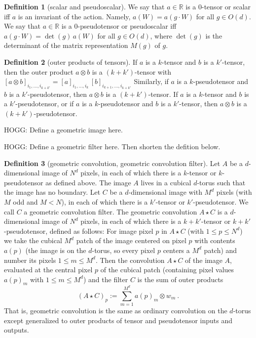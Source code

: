 \documentclass{article}
\theoremstyle{definition}
\newtheorem{definition}{Definition}
\begin{document}
\begin{definition}[scalar and pseudoscalar]
We say that $a\in \mathbb R$ is a $0$-tensor or scalar iff $a$ is an invariant of the action.
Namely, $a(W) = a(g\cdot W)$ for all $g\in O(d)$.
We say that
$a\in \mathbb R$ is a $0$-pseudotensor or pseudoscalar iff $a(g \cdot W) = \det(g)\,a(W)$ for all $g\in O(d)$,
where $\det(g)$ is the determinant of the matrix representation $M(g)$ of $g$.
\end{definition}

\begin{definition}[outer products of tensors]
If $a$ is a $k$-tensor and $b$ is a $k'$-tensor, then the outer product $a\otimes b$ is a $(k+k')$-tensor with $[a\otimes b]_{i_1,\ldots,i_{k+k'}} = [a]_{i_1,\ldots,i_k}\,[b]_{i_{k+1},\ldots,i_{k+k'}}$
Similarly, if $a$ is a $k$-pseudotensor and $b$ is a $k'$-pseudotensor, then $a\otimes b$ is a $(k+k')$-tensor.
If $a$ is a $k$-tensor and $b$ is a $k'$-pseudotensor, or if $a$ is a $k$-pseudotensor and $b$ is a $k'$-tensor, then $a\otimes b$ is a $(k+k')$-pseudotensor.
\end{definition}

HOGG: Define a geometric image here.

HOGG: Define a geometric filter here. Then shorten the defition below.

\begin{definition}[geometric convolution, geometric convolution filter]
Let $A$ be a $d$-dimensional image of $N^d$ pixels, in each of which there is a $k$-tensor or $k$-pseudotensor as defined above.
The image $A$ lives in a cubical $d$-torus such that the image has no boundary.
Let $C$ be a $d$-dimensional image with $M^d$ pixels (with $M$ odd and $M<N$), in each of which there is a $k'$-tensor or $k'$-pseudotensor.
We call $C$ a geometric convolution filter.
The geometric convolution $A\star C$ is a $d$-dimensional image of $N^d$ pixels, in each of which there is a $k+k'$-tensor or $k+k'$-pseudotensor, defined as follows:
For image pixel $p$ in $A\star C$ (with $1\leq p\leq N^d$) we take the cubical $M^d$ patch of the image centered on pixel $p$ with contents $a(p)$ (the image is on the $d$-torus, so every pixel $p$ centers a $M^d$ patch) and number its pixels $1\leq m\leq M^d$.
Then the convolution $A\star C$ of the image $A$, evaluated at the central pixel $p$ of the cubical patch (containing pixel values $a(p)_m$ with $1\leq m\leq M^d$) and the filter $C$ is the sum of outer products
\begin{equation}
    (A\star C)_p := \sum_{m=1}^{M^d} a(p)_m \otimes w_m~.
\end{equation}
That is, geometric convolution is the same as ordinary convolution on the $d$-torus except generalized to outer products of tensor and pseudotensor inputs and outputs.
\end{definition}
\end{document}
